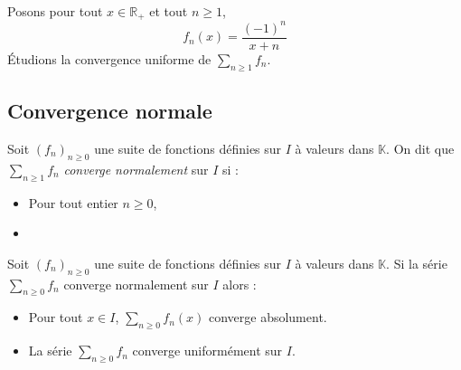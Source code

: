 \documentclass[a4paper,10pt]{report}
\begin{document}
\begin{Exemple} Posons pour tout $x \in \mathbb{R}_+$ et tout $n \geq 1$, 
$$ f_n(x) = \frac{(-1)^n}{x+n}$$
Étudions la convergence uniforme de $\sum_{n \geq 1} f_n$.

%
%
%
%
%
%

\vspace{10.2cm}
\end{Exemple}

\subsection{Convergence normale}

\begin{Definition}{} Soit $(f_n)_{n \geq 0}$ une suite de fonctions définies sur $I$ à valeurs dans $\mathbb{K}$. On dit que $\sum_{n \geq 1} f_n$ \emph{converge normalement} sur $I$ si :

\begin{itemize}
\item Pour tout entier $n \geq 0$, \phantom{$f_n$ est bornée sur $I$.}
\item {}
\end{itemize}
\end{Definition}

\begin{Theoreme}{} Soit $(f_n)_{n \geq 0}$ une suite de fonctions définies sur $I$ à valeurs dans $\mathbb{K}$. Si la série $\sum_{n \geq 0} f_n$ converge normalement sur $I$ alors :

\begin{itemize}
\item Pour tout $x \in I$, $\sum_{n \geq 0} f_n(x)$ converge absolument.
\item La série $\sum_{n \geq 0} f_n$ converge uniformément sur $I$.
\end{itemize}
\end{Theoreme}
\end{document}
